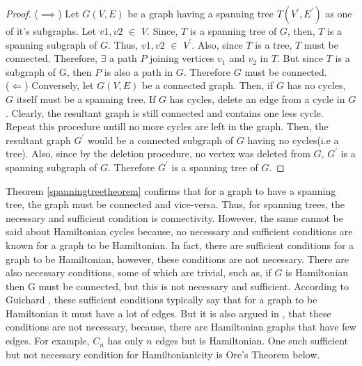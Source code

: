 \documentclass[12pt]{article}
\numberwithin{equation}{subsection}
\numberwithin{table}{subsection}
\begin{document}
\begin{proof}
($\implies$) Let $\mathit{G(V,E)}$ be a graph having a spanning tree $\mathit{T(V^\prime,E^\prime)}$ as one of it's subgraphs. Let $\mathit{v1, v2}$ $\in$ $\mathit{V}$. Since, $\mathit{T}$ is a spanning tree of $\mathit{G}$, then, $\mathit{T}$ is a spanning subgraph of $\mathit{G}$. Thus, $\mathit{v1, v2}$ $\in$ $V^\prime$. Also, since $\mathit{T}$ is a tree, $\mathit{T}$ must be connected. Therefore, $\exists$ a path $\mathit{P}$ joining vertices $\mathit{v_1}$ and $\mathit{v_2}$ in $\mathit{T}$. But since $\mathit{T}$ is a subgraph of G, then $\mathit{P}$ is also a path in $\mathit{G}$. Therefore $\mathit{G}$ must be connected.\\
($\Leftarrow$) Conversely, let $\mathit{G(V,E)}$ be a connected graph. Then, if $\mathit{G}$ has no cycles, $\mathit{G}$ itself must be a spanning tree. If $\mathit{G}$ has cycles, delete an edge from a cycle in $\mathit{G}$. Clearly, the resultant graph is still connected and contains one less cycle. Repeat this procedure untill no more cycles are left in the graph. Then, the resultant graph $\mathit{G^\prime}$ would be a connected subgraph of $\mathit{G}$ having no cycles(i.e a tree). Also, since by the deletion procedure, no vertex was deleted from $\mathit{G}$, $\mathit{G^\prime}$ is a spanning subgraph of $\mathit{G}$. Therefore $\mathit{G^\prime}$ is a spanning tree of $\mathit{G}$. 
\end{proof}
Theorem \ref{spanningtreetheorem} confirms that for a graph to have a spanning tree, the graph must be connected and vice-versa. Thus, for spanning trees, the necessary and sufficient condition is connectivity. However, the same cannot be said about Hamiltonian cycles because, no necessary and sufficient conditions are known for a graph to be Hamiltonian. In fact, there are sufficient conditions for a graph to be Hamiltonian, however, these conditions are not necessary. There are also necessary conditions, some of which are trivial, such as, if $\mathit{G}$ is Hamiltonian then G must be connected, but this is not necessary and sufficient. According to Guichard \cite{guichard_2018}, these sufficient conditions typically say that for a graph to be Hamiltonian it must have a lot of edges. But it is also argued in \cite{guichard_2018}, that these conditions are not necessary, because, there are Hamiltonian graphs that have few edges. For example, $\mathit{C_n}$ has only $\mathit{n}$ edges but is Hamiltonian. One such sufficient but not necessary condition for Hamiltonianicity is Ore's Theorem below.
\end{document}
